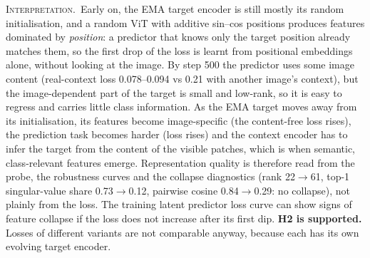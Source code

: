 \documentclass[10pt]{article}
\newcommand{\obs}{\textsc{Observed.}~}
\newcommand{\interp}{\textsc{Interpretation.}~}
\begin{document}
\interp Early on, the EMA target encoder is still mostly its random initialisation, and a random ViT with additive sin--cos
positions produces features dominated by \emph{position}: a predictor that knows only the target position already matches
them, so the first drop of the loss is learnt from positional embeddings alone, without looking at the image. By step 500
the predictor uses some image content (real-context loss 0.078--0.094 vs 0.21 with another image's context), but the
image-dependent part of the target is small and low-rank, so it is easy to regress and carries little class information.
As the EMA target moves away from its initialisation, its features become image-specific (the content-free loss rises), the
prediction task becomes harder (loss rises) and the context encoder has to infer the target from the content of the visible
patches, which is when semantic, class-relevant features emerge. Representation quality is therefore read from the probe,
the robustness curves and the collapse diagnostics (rank 22$\to$61, top-1 singular-value share 0.73$\to$0.12, pairwise cosine
0.84$\to$0.29: no collapse), not plainly from the loss. The training latent predictor loss curve can show signs of feature 
collapse if the loss does not increase after its first dip. \textbf{H2 is supported.} Losses of different variants are not comparable
anyway, because each has its own evolving target encoder.


\end{document}
